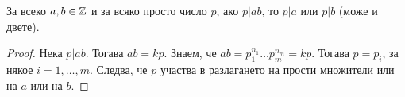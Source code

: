   

  



\begin{problem}
  За всеко $a,b \in \mathbb{Z}$ и за всяко просто число $p$,
  ако $p\vert ab$, то $p\vert a$ или $p\vert b$ (може и двете).
\end{problem}
\begin{proof}
  Нека $p \vert ab$. Тогава $ab = kp$.
  Знаем, че $ab = p^{n_1}_1\dots p^{n_m}_m = kp$.
  Тогава $p = p_i$, за някое $i = 1,\dots,m$.
  Следва, че $p$ участва в разлагането на прости множители или на $a$ или на $b$.
\end{proof}


